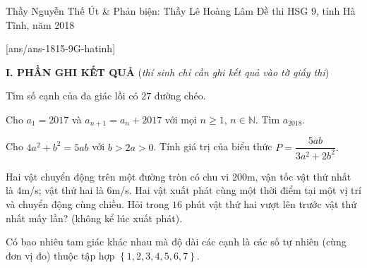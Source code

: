 \begin{name}
{Thầy  Nguyễn Thế Út \& Phản biện: Thầy Lê Hoàng Lâm}
{Đề thi HSG 9, tỉnh Hà Tĩnh, năm 2018}
\end{name}
\setcounter{ex}{0}
[ans/ans-1815-9G-hatinh]

\textbf{I. PHẦN GHI KẾT QUẢ} (\textit{thí sinh chỉ cần ghi kết quả vào tờ giấy thi})
\begin{ex}%
	Tìm số cạnh của đa giác lồi có $27$ đường chéo.
\end{ex}
\begin{ex}%
	Cho $a_1=2017$ và $a_{n+1}=a_n+2017$ với mọi $n\ge 1$, $n\in\mathbb{N}$. Tìm $a_{2018}$.
\end{ex}
\begin{ex}%
	Cho $4a^2+b^2=5ab$ với $b>2a>0$. Tính giá trị của biểu thức $P=\dfrac{5ab}{3a^2+2b^2}.$
\end{ex}
\begin{ex}%
	Hai vật chuyển động trên một đường tròn có chu vi $200$m, vận tốc vật thứ nhất là $4$m/s; vật thứ hai là $6$m/s. Hai vật xuất phát cùng một thời điểm tại một vị trí và chuyển động cùng chiều. Hỏi trong $16$ phút vật thứ hai vượt lên trước vật thứ nhất mấy lần? (không kể lúc xuất phát).
\end{ex}
\begin{ex}%
	Có bao nhiêu tam giác khác nhau mà độ dài các cạnh là các số tự nhiên (cùng đơn vị đo) thuộc tập hợp $\left\{1,2,3,4,5,6,7\right\}$.
\end{ex}
